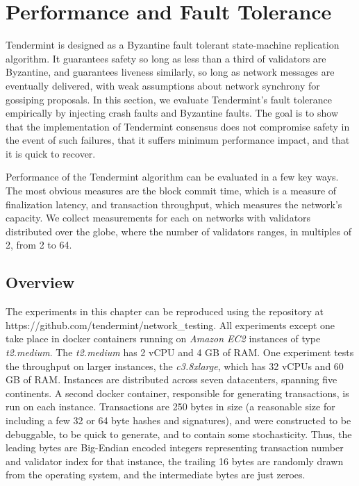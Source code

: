 \chapter{Performance and Fault Tolerance}
\label{ch:performance}

Tendermint is designed as a Byzantine fault tolerant state-machine replication algorithm.
It guarantees safety so long as less than a third of validators are Byzantine, 
and guarantees liveness similarly, so long as network messages are eventually delivered,
with weak assumptions about network synchrony for gossiping proposals.
In this section, we evaluate Tendermint's fault tolerance empirically by injecting 
crash faults and Byzantine faults.
The goal is to show that the implementation of Tendermint consensus does not compromise safety in the event of such failures,
that it suffers minimum performance impact, and that it is quick to recover.

Performance of the Tendermint algorithm can be evaluated in a few key ways.
The most obvious measures are the block commit time, which is a measure of finalization latency, 
and transaction throughput, which measures the network's capacity.
We collect measurements for each on networks with validators distributed over the globe, 
where the number of validators ranges, in multiples of 2, from 2 to 64.

\section{Overview}

The experiments in this chapter can be reproduced using the repository at https://github.com/tendermint/network\_testing.
All experiments except one take place in docker containers 
running on \emph{Amazon EC2} instances of type \emph{t2.medium}.
The \emph{t2.medium} has 2 vCPU and 4 GB of RAM.
One experiment tests the throughput on larger instances, the \emph{c3.8xlarge}, 
which has 32 vCPUs and 60 GB of RAM.
Instances are distributed across seven datacenters, spanning five continents.
A second docker container, responsible for generating transactions, is run on each instance.
Transactions are 250 bytes in size (a reasonable size for including a few 32 or 64 byte hashes and signatures),
and were constructed to be debuggable, to be quick to generate, and to contain some stochasticity.
Thus, the leading bytes are Big-Endian encoded integers 
representing transaction number and validator index for that instance,
the trailing 16 bytes are randomly drawn from the operating system, 
and the intermediate bytes are just zeroes.

